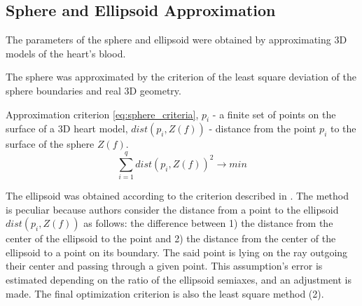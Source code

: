 \documentclass[conference]{IEEEtran}
\begin{document}
\subsection{Sphere and Ellipsoid Approximation}
The parameters of the sphere and ellipsoid were obtained by approximating 3D models of the heart's blood.

The sphere was approximated by the criterion of the least square deviation of the sphere boundaries and real 3D geometry.

Approximation criterion \ref{eq:sphere_criteria},
$ p_i$ - a finite set of points on the surface of a 3D heart model,
$dist(p_i,Z(f))$ -  distance from the point $ p_i $ to the surface of the sphere $ Z (f) $. 
\begin{equation}
    \sum_{i=1}^{q}dist(p_i,Z(f))^2 \rightarrow min
    \label{eq:sphere_criteria}
\end{equation}

The ellipsoid was obtained according to the criterion described in . 
The method is peculiar because authors consider the distance from a point to the
ellipsoid $ dist (p_i, Z (f)) $ as follows: the difference between 1) the
distance from the center of the ellipsoid to the point and 2) the distance from
the center of the ellipsoid to a point on its boundary. The said point is lying
on the ray outgoing their center and passing through a given point. This
assumption's error is estimated depending on the ratio of the ellipsoid
semiaxes, and an adjustment is made. The final optimization criterion is also
the least square method (2). 
\end{document}
